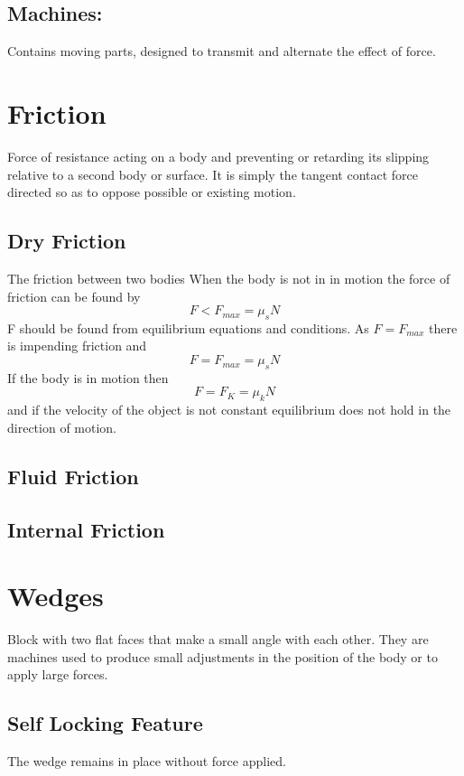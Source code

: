 \documentclass[14pt]{article}
\begin{document}
    \subsection{Machines:}
    Contains moving parts, designed to transmit and alternate the effect
    of force.
    \section{Friction}
    Force of resistance acting on a body and preventing or retarding its
    slipping relative to a second body or surface. It is simply the
    tangent contact force directed so as to oppose possible or existing
    motion.
    \subsection{Dry Friction}
    The friction between two bodies When the body is not in in motion
    the force of friction can be found by
    $$F<F_{max}=\mu_sN$$ F should be found from equilibrium equations
    and conditions. As $F=F_{max}$ there is impending friction and
    $$F=F_{max}=\mu_sN$$ If the body is in motion then 
    $$F=F_K=\mu_kN$$ and if the velocity of the object is not constant
    equilibrium does not hold in the direction of motion.
    \subsection{Fluid Friction}
    \subsection{Internal Friction}
    \section{Wedges}
    Block with two flat faces that make a small angle with each other.
    They are machines used to produce small adjustments in the position
    of the body or to apply large forces. 
    \subsection{Self Locking Feature}
    The wedge remains in place without force applied. 
\end{document}
